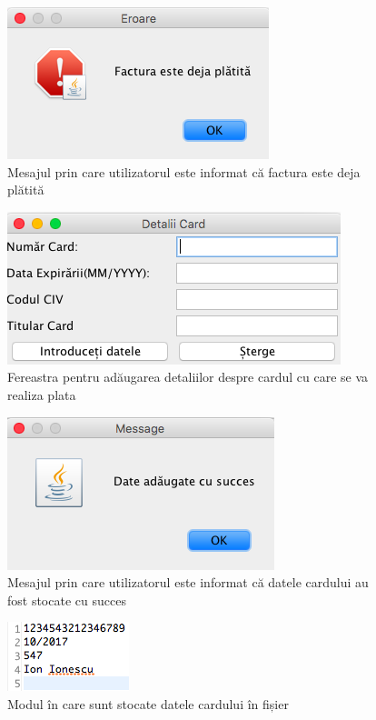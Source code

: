 \documentclass[12pt]{book}
\begin{document}
\begin{figure}[!ht]
	\centering
	\includegraphics{FacturaPlatita}
	\caption{Mesajul prin care utilizatorul este informat că factura este deja plătită}
\end{figure}

\begin{figure}[!ht]
	\centering
	\includegraphics{DetaliiCard}
	\caption{Fereastra pentru adăugarea detaliilor despre cardul cu care se va realiza plata}
\end{figure}

\begin{figure}[!ht]
	\centering
	\includegraphics{DateCardSucces}
	\caption{Mesajul prin care utilizatorul este informat că datele cardului au fost stocate cu succes}
\end{figure}

\begin{figure}[!ht]
	\centering
	\includegraphics{DetaliiCardDocument}
	\caption{Modul în care sunt stocate datele cardului în fișier}
\end{figure}
\end{document}
